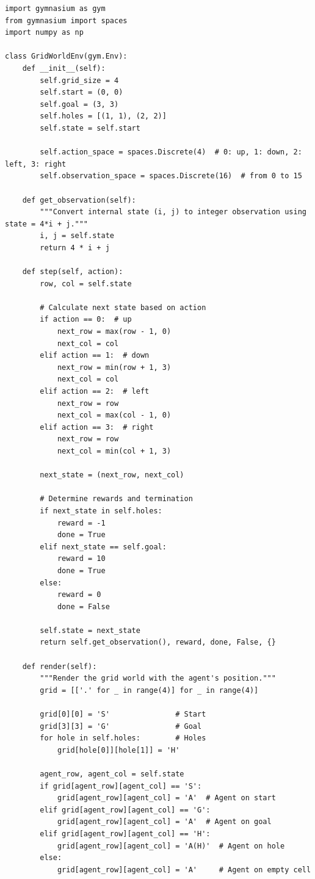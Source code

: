 \documentclass[12pt]{article}
\begin{document}
{{{\begin{verbatim}
import gymnasium as gym
from gymnasium import spaces
import numpy as np

class GridWorldEnv(gym.Env):
    def __init__(self):       
        self.grid_size = 4
        self.start = (0, 0)  
        self.goal = (3, 3)  
        self.holes = [(1, 1), (2, 2)]  
        self.state = self.start
        
        self.action_space = spaces.Discrete(4)  # 0: up, 1: down, 2: left, 3: right
        self.observation_space = spaces.Discrete(16)  # from 0 to 15

    def get_observation(self):
        """Convert internal state (i, j) to integer observation using state = 4*i + j."""
        i, j = self.state
        return 4 * i + j

    def step(self, action):        
        row, col = self.state
        
        # Calculate next state based on action
        if action == 0:  # up
            next_row = max(row - 1, 0)
            next_col = col
        elif action == 1:  # down
            next_row = min(row + 1, 3)
            next_col = col
        elif action == 2:  # left
            next_row = row
            next_col = max(col - 1, 0)
        elif action == 3:  # right
            next_row = row
            next_col = min(col + 1, 3)

        next_state = (next_row, next_col)
        
        # Determine rewards and termination
        if next_state in self.holes:
            reward = -1
            done = True
        elif next_state == self.goal:
            reward = 10
            done = True
        else:
            reward = 0
            done = False
        
        self.state = next_state
        return self.get_observation(), reward, done, False, {}

    def render(self):
        """Render the grid world with the agent's position."""
        grid = [['.' for _ in range(4)] for _ in range(4)]
        
        grid[0][0] = 'S'               # Start
        grid[3][3] = 'G'               # Goal
        for hole in self.holes:        # Holes
            grid[hole[0]][hole[1]] = 'H'
        
        agent_row, agent_col = self.state
        if grid[agent_row][agent_col] == 'S':
            grid[agent_row][agent_col] = 'A'  # Agent on start
        elif grid[agent_row][agent_col] == 'G':
            grid[agent_row][agent_col] = 'A'  # Agent on goal
        elif grid[agent_row][agent_col] == 'H':
            grid[agent_row][agent_col] = 'A(H)'  # Agent on hole
        else:
            grid[agent_row][agent_col] = 'A'     # Agent on empty cell
        

\end{verbatim}}}}
\end{document}
